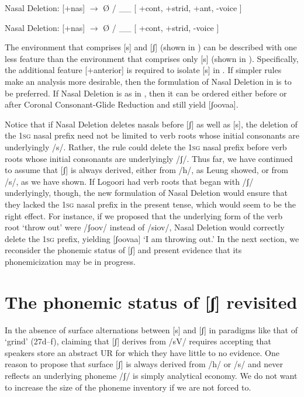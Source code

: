 \documentclass[output=paper]{langsci/langscibook}
\begin{document}
\ea\label{ex:glewwe:30}{}
 Nasal Deletion: [+nas] $\rightarrow$ Ø / \_\_ {[} +cont, +strid, +ant, -voice {]}\\{}
\z

\ea\label{ex:glewwe:31}{}
 Nasal Deletion: [+nas] $\rightarrow$ Ø / \_\_ {[} +cont, +strid, -voice {]} \\{}
\z



The environment that comprises [s] and [ʃ] (shown in ) can be described with one less feature than the environment that comprises only [s] (shown in ). Specifically, the additional feature [+anterior] is required to isolate [s] in . If simpler rules make an analysis more desirable, then the formulation of Nasal Deletion in  is to be preferred. If Nasal Deletion is as in , then it can be ordered either before or after Coronal Consonant-Glide Reduction and still yield [ʃoovaa]. 

Notice that if Nasal Deletion deletes nasals before [ʃ] as well as [s], the deletion of the 1\textsc{sg} nasal prefix need not be limited to verb roots whose initial consonants are underlyingly /s/. Rather, the rule could delete the 1\textsc{sg} nasal prefix before verb roots whose initial consonants are underlyingly /ʃ/. Thus far, we have continued to assume that [ʃ] is always derived, either from /h/, as Leung showed, or from /s/, as we have shown. If Logoori had verb roots that began with /ʃ/ underlyingly, though, the new formulation of Nasal Deletion would ensure that they lacked the 1\textsc{sg} nasal prefix in the present tense, which would seem to be the right effect. For instance, if we proposed that the underlying form of the verb root ‘throw out’ were /ʃoov/ instead of /siov/, Nasal Deletion would correctly delete the 1\textsc{sg} prefix, yielding [ʃoovaa] ‘I am throwing out.’ In the next section, we reconsider the phonemic status of [ʃ] and present evidence that its phonemicization may be in progress.

\section{The phonemic status of [ʃ] revisited}

In the absence of surface alternations between [s] and [ʃ] in paradigms like that of ‘grind’ (27d–f), claiming that [ʃ] derives from /sV/ requires accepting that speakers store an abstract UR for which they have little to no evidence. One reason to propose that surface [ʃ] is always derived from /h/ or /s/ and never reflects an underlying phoneme /ʃ/ is simply analytical economy. We do not want to increase the size of the phoneme inventory if we are not forced to.
\end{document}
